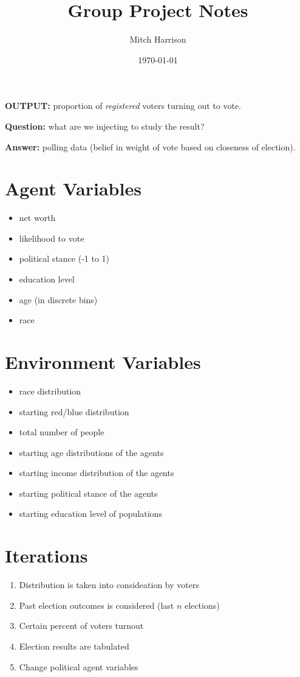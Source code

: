 \documentclass[titlepage, 12pt, leqno]{article}
\title{\Huge{Group Project Notes}}
\author{\large{Mitch Harrison}}
\date{\today}
\begin{document}
\setlength{\parskip}{1\baselineskip}
\setlength{\parindent}{15pt}

\textbf{OUTPUT:} proportion of \textit{registered} voters turning out to vote.

\textbf{Question:} what are we injecting to study the result? 

\textbf{Answer:} polling data (belief in weight of vote based on closeness of
election).

\section{Agent Variables}
\begin{itemize}
    \item net worth
    \item likelihood to vote
    \item political stance (-1 to 1)
    \item education level
    \item age (in discrete bins)
    \item race
\end{itemize}

\section{Environment Variables}
\begin{itemize}
    \item race distribution
    \item starting red/blue distribution
    \item total number of people
    \item starting age distributions of the agents
    \item starting income distribution of the agents
    \item starting political stance of the agents
    \item starting education level of populations
\end{itemize}

\section{Iterations}
\begin{enumerate}
    \item Distribution is taken into consideation by voters
    \item Past election outcomes is considered (last $n$ elections)
    \item Certain percent of voters turnout
    \item Election results are tabulated
    \item Change political agent variables
\end{enumerate}
\end{document}
